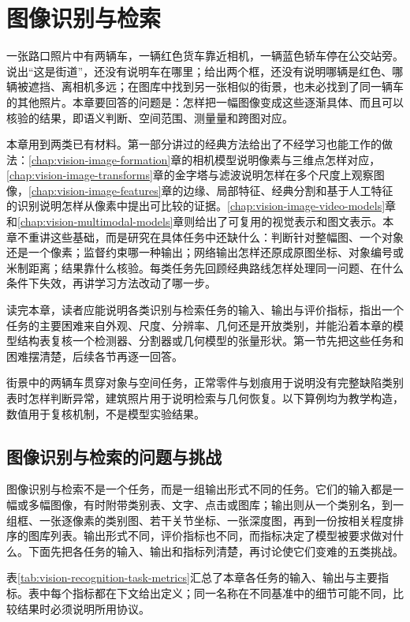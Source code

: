 \chapter{图像识别与检索}
\label{chap:vision-image-recognition}

一张路口照片中有两辆车，一辆红色货车靠近相机，一辆蓝色轿车停在公交站旁。说出“这是街道”，还没有说明车在哪里；给出两个框，还没有说明哪辆是红色、哪辆被遮挡、离相机多远；在图库中找到另一张相似的街景，也未必找到了同一辆车的其他照片。本章要回答的问题是：怎样把一幅图像变成这些逐渐具体、而且可以核验的结果，即语义判断、空间范围、测量量和跨图对应。

本章用到两类已有材料。第一部分讲过的经典方法给出了不经学习也能工作的做法：\ref{chap:vision-image-formation}章的相机模型说明像素与三维点怎样对应，\ref{chap:vision-image-transforms}章的金字塔与滤波说明怎样在多个尺度上观察图像，\ref{chap:vision-image-features}章的边缘、局部特征、经典分割和基于人工特征的识别说明怎样从像素中提出可比较的证据。\ref{chap:vision-image-video-models}章和\ref{chap:vision-multimodal-models}章则给出了可复用的视觉表示和图文表示。本章不重讲这些基础，而是研究在具体任务中还缺什么：判断针对整幅图、一个对象还是一个像素；监督约束哪一种输出；网络输出怎样还原成原图坐标、对象编号或米制距离；结果靠什么核验。每类任务先回顾经典路线怎样处理同一问题、在什么条件下失效，再讲学习方法改动了哪一步。

读完本章，读者应能说明各类识别与检索任务的输入、输出与评价指标，指出一个任务的主要困难来自外观、尺度、分辨率、几何还是开放类别，并能沿着本章的模型结构表复核一个检测器、分割器或几何模型的张量形状。第一节先把这些任务和困难摆清楚，后续各节再逐一回答。

街景中的两辆车贯穿对象与空间任务，正常零件与划痕用于说明没有完整缺陷类别表时怎样判断异常，建筑照片用于说明检索与几何恢复。以下算例均为教学构造，数值用于复核机制，不是模型实验结果。

\section{图像识别与检索的问题与挑战}
\label{sec:vision-recognition-challenges}

图像识别与检索不是一个任务，而是一组输出形式不同的任务。它们的输入都是一幅或多幅图像，有时附带类别表、文字、点击或图库；输出则从一个类别名，到一组框、一张逐像素的类别图、若干关节坐标、一张深度图，再到一份按相关程度排序的图库列表。输出形式不同，评价指标也不同，而指标决定了模型被要求做对什么。下面先把各任务的输入、输出和指标列清楚，再讨论使它们变难的五类挑战。

表\ref{tab:vision-recognition-task-metrics}汇总了本章各任务的输入、输出与主要指标。表中每个指标都在下文给出定义；同一名称在不同基准中的细节可能不同，比较结果时必须说明所用协议。

